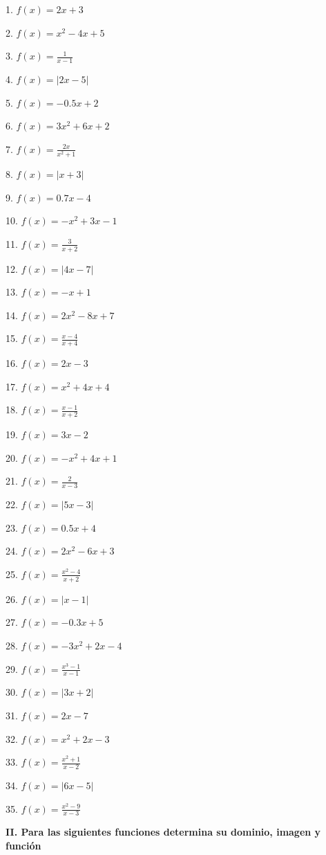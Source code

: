 \documentclass[]{book}
\begin{document}
\begin{multicols}{2}
1. $f(x) = 2x + 3$

2. $f(x) = x^2 - 4x + 5$

3. $f(x) = \frac{1}{x - 1}$

4. $f(x) = |2x - 5|$

5. $f(x) = -0.5x + 2$

6. $f(x) = 3x^2 + 6x + 2$
 
7. $f(x) = \frac{2x}{x^2 + 1}$
 
8. $f(x) = |x + 3|$
 
9. $f(x) = 0.7x - 4$
 
10. $f(x) = -x^2 + 3x - 1$
 
11. $f(x) = \frac{3}{x + 2}$

12. $f(x) = |4x - 7|$

13. $f(x) = -x + 1$

14. $f(x) = 2x^2 - 8x + 7$

15. $f(x) = \frac{x - 4}{x + 4}$
  
16. $f(x) = 2x - 3$

17. $f(x) = x^2 + 4x + 4$

18. $f(x) = \frac{x - 1}{x + 2}$

19. $f(x) = 3x - 2$

20. $f(x) = -x^2 + 4x + 1$

21. $f(x) = \frac{2}{x - 3}$

22. $f(x) = |5x - 3|$

23. $f(x) = 0.5x + 4$

24. $f(x) = 2x^2 - 6x + 3$

25. $f(x) = \frac{x^2 - 4}{x + 2}$

26. $f(x) = |x - 1|$

27. $f(x) = -0.3x + 5$

28. $f(x) = -3x^2 + 2x - 4$

29. $f(x) = \frac{x^3 - 1}{x - 1}$

30. $f(x) = |3x + 2|$

31. $f(x) = 2x - 7$

32. $f(x) = x^2 + 2x - 3$

33. $f(x) = \frac{x^2 + 1}{x - 2}$

34. $f(x) = |6x - 5|$

35. $f(x) = \frac{x^2 - 9}{x - 3}$
\end{multicols}

\textbf{II. Para las siguientes funciones determina su dominio, imagen y
función}
\end{document}
